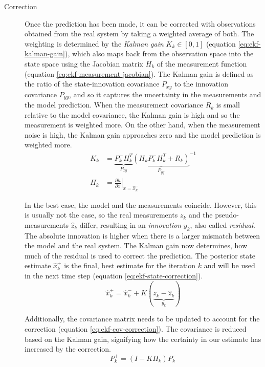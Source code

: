 \begin{description}
\item[Correction] Once the prediction has been made, it can be corrected with observations obtained from the real system by taking a weighted average of both. The weighting is determined by the \textit{Kalman gain} $K_k \in [0, 1]$ (equation \ref{eq:ekf-kalman-gain}), which also maps back from the observation space into the state space using the Jacobian matrix $H_k$ of the measurement function (equation \ref{eq:ekf-measurement-jacobian}). The Kalman gain is defined as the ratio of the state-innovation covariance $P_{xy}$ to the innovation covariance $P_{yy}$, and so it captures the uncertainty in the measurements and the model prediction. When the measurement covariance $R_k$ is small relative to the model covariance, the Kalman gain is high and so the measurement is weighted more. On the other hand, when the measurement noise is high, the Kalman gain approaches zero and the model prediction is weighted more.
\begin{align}\label{eq:ekf-kalman-gain}%
K_k &= \underbrace{P_k^- H_k^T}_\textrm{$P_{xy}$} {\underbrace{(H_k P_k^- H_k^T + R_k)}_\textrm{$P_{yy}$}}^{-1} \\%
\label{eq:ekf-measurement-jacobian}%
H_k &= \left. \frac{\partial h}{\partial x} \right|_{x = \hat{x}_{k}^-}%
\end{align}

In the best case, the model and the measurements coincide. However, this is usually not the case, so the real measurements $z_k$ and the pseudo-measurements $\hat{z}_k$ differ, resulting in an \textit{innovation} $y_k$, also called \textit{residual}. The absolute innovation is higher when there is a larger mismatch between the model and the real system. The Kalman gain now determines, how much of the residual is used to correct the prediction. The posterior state estimate $\hat{x}_k^+$ is the final, best estimate for the iteration $k$ and will be used in the next time step (equation \ref{eq:ekf-state-correction}).
\begin{equation}\label{eq:ekf-state-correction}%
\hat{x}_k^+ = \hat{x}_k^- + K(\underbrace{z_k - \hat{z}_k}_\textrm{$y_k$})%
\end{equation}

Additionally, the covariance matrix needs to be updated to account for the correction (equation \ref{eq:ekf-cov-correction}). The covariance is reduced based on the Kalman gain, signifying how the certainty in our estimate has increased by the correction.
\begin{equation}\label{eq:ekf-cov-correction}%
P_k^+ = (I - K H_k)P_k^-%
\end{equation}
\end{description}


